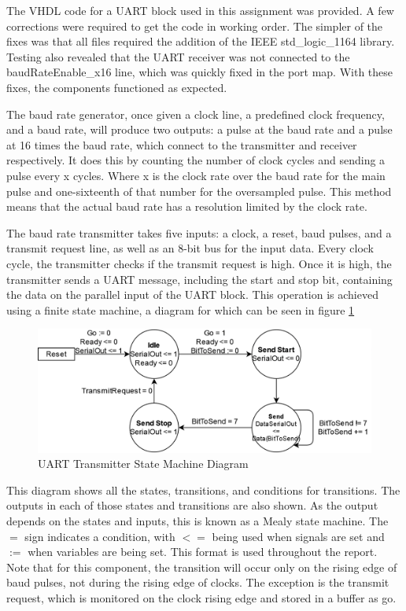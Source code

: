 \documentclass[11pt]{article}
\begin{document}
The VHDL code for a UART block used in this assignment was provided. 
A few corrections were required to get the code in working order. 
The simpler of the fixes was that all files required the addition of the IEEE std\_logic\_1164 library. 
Testing also revealed that the UART receiver was not connected to the baudRateEnable\_x16 line, which was quickly fixed in the port map.
With these fixes, the components functioned as expected.

The baud rate generator, once given a clock line, a predefined clock frequency, and a baud rate, will produce two outputs: a pulse at the baud rate and a pulse at 16 times the baud rate, which connect to the transmitter and receiver respectively.
It does this by counting the number of clock cycles and sending a pulse every x cycles.
Where x is the clock rate over the baud rate for the main pulse and one-sixteenth of that number for the oversampled pulse.
This method means that the actual baud rate has a resolution limited by the clock rate.

The baud rate transmitter takes five inputs: a clock, a reset, baud pulses, and a transmit request line, as well as an 8-bit bus for the input data.
Every clock cycle, the transmitter checks if the transmit request is high.
Once it is high, the transmitter sends a UART message, including the start and stop bit, containing the data on the parallel input of the UART block.
This operation is achieved using a finite state machine, a diagram for which can be seen in figure \ref{fig:transmitsm}  

\begin{figure}[H]        
    \centering
    \includegraphics[width=.66\textwidth]{TransmitterSM.drawio.png}
    \caption{UART Transmitter State Machine Diagram}
    \label{fig:transmitsm}
\end{figure} 

This diagram shows all the states, transitions, and conditions for transitions.
The outputs in each of those states and transitions are also shown. 
As the output depends on the states and inputs, this is known as a Mealy state machine.
The $=$ sign indicates a condition, with $<=$ being used when signals are set and $:=$ when variables are being set. 
This format is used throughout the report.
Note that for this component, the transition will occur only on the rising edge of baud pulses, not during the rising edge of clocks. 
The exception is the transmit request, which is monitored on the clock rising edge and stored in a buffer as go.
\end{document}

